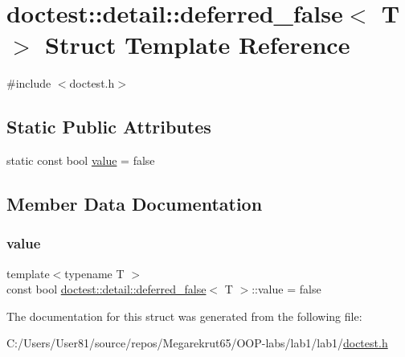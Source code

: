 \hypertarget{structdoctest_1_1detail_1_1deferred__false}{}\section{doctest\+:\+:detail\+:\+:deferred\+\_\+false$<$ T $>$ Struct Template Reference}
\label{structdoctest_1_1detail_1_1deferred__false}


{\ttfamily \#include $<$doctest.\+h$>$}

\subsection*{Static Public Attributes}
\begin{DoxyCompactItemize}
\item 
static const bool \mbox{\hyperlink{structdoctest_1_1detail_1_1deferred__false_abc8eec7a8439ab592f76068cb408d106}{value}} = false
\end{DoxyCompactItemize}


\subsection{Member Data Documentation}
\mbox{\label{structdoctest_1_1detail_1_1deferred__false_abc8eec7a8439ab592f76068cb408d106}} 
\subsubsection{\texorpdfstring{value}{value}}
{\footnotesize\ttfamily template$<$typename T $>$ \\
const bool \mbox{\hyperlink{structdoctest_1_1detail_1_1deferred__false}{doctest\+::detail\+::deferred\+\_\+false}}$<$ T $>$\+::value = false\hspace{0.3cm}{\ttfamily [static]}}



The documentation for this struct was generated from the following file\+:\begin{DoxyCompactItemize}
\item 
C\+:/\+Users/\+User81/source/repos/\+Megarekrut65/\+O\+O\+P-\/labs/lab1/lab1/\mbox{\hyperlink{doctest_8h}{doctest.\+h}}\end{DoxyCompactItemize}
